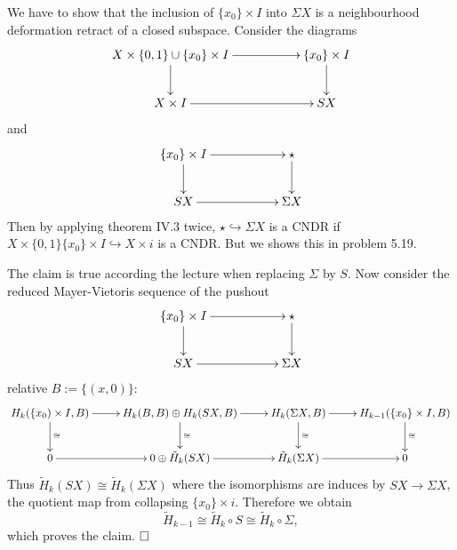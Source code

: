 \documentclass[11pt]{book}
\numberwithin{dummy}{section}
\theoremstyle{nonumberbreak}
\newenvironment{sol}[1][]{\ifthenelse{\equal{#1}{}}{\solution}{\solution[#1]}\rm}{\endsolution}
\newenvironment{prob}[1][]{\ifthenelse{\equal{#1}{}}{\problem}{\problem[#1]}\rm}{\endproblem}
\newcommand{\la}{\longrightarrow}
\begin{document}
\begin{spacing}{1.4}
\begin{prob}
\begin{sol}
\begin{compactenum}
\item We have to show that the inclusion of $\{x_0\} \times I$ into $\Sigma X$ is a neighbourhood deformation retract of a closed subspace. Consider the diagrams
$$
\begin{xy}
\xymatrix{
X \times \{0,1\} \cup \{x_0\} \times I \ar[rr] \ar[d] && \{x_0\} \times  I \ar[d] \\ X \times I \ar[rr] && SX
}
\end{xy}
$$
and 
$$
\begin{xy}
\xymatrix{
\{x_0\} \times I \ar[rr] \ar[d] && \star \ar[d] \\ SX \ar[rr] && \Sigma X 
}
\end{xy}
$$
Then by applying theorem IV.3 twice, $\star\hookrightarrow \Sigma X$ is a CNDR if $X \times \{0,1\} \{x_0\} \times I \hookrightarrow X\times i$ is a CNDR. But we shows this in problem 5.19.
\item The claim is true according the lecture when replacing $\Sigma$ by $S$. Now consider the reduced Mayer-Vietoris sequence of the pushout
$$
\begin{xy}
\xymatrix{
\{x_0\} \times I \ar[rr] \ar[d] && \star \ar[d] \\ SX \ar[rr] && \Sigma X 
}
\end{xy}
$$
relative $B:=\{(x,0)\}$:
$$
\begin{xy}
\xymatrix{
H_k(\{x_0) \times I, B) \ar[r] \ar[d]^{\cong} & H_k(B,B) \oplus H_k(SX,B) \ar[d]^{\cong} \ar[r] & H_k(\Sigma X,B) \ar[d]^{\cong} \ar[r] & H_{k-1}(\{x_0\} \times I, B) \ar[d]^{\cong} \\
0 \ar[r] & 0 \oplus \tilde{H}_k(SX) \ar[r] & \tilde{H}_k(\Sigma X) \ar[r] & 0
}
\end{xy}
$$
Thus $\tilde{H}_k(SX) \cong \tilde{H}_k(\Sigma X)$ where the isomorphisms are induces by $SX \la \Sigma X$, the quotient map from collapsing $\{x_0\} \times i$. Therefore we obtain 
$$\tilde{H}_{k-1} \cong \tilde{H}_k \circ S \cong \tilde{H}_k \circ \Sigma,$$
which proves the claim. $\hfill \Box$
\end{compactenum}
\end{sol}

\end{prob}


















\end{spacing}
\end{document}
